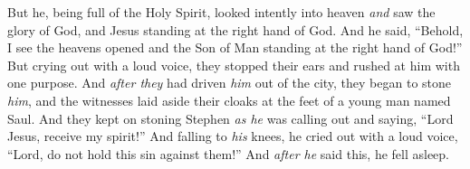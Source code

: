 \begin{biblechapter}
\verse But he, being full of the Holy Spirit, looked intently into heaven \textit{and} saw the glory of God, and Jesus standing at the right hand of God.
\verse And he said, “Behold, I see the heavens opened and the Son of Man standing at the right hand of God!”
\verse But crying out with a loud voice, they stopped their ears and rushed at him with one purpose.
\verse And \textit{after they} had driven \textit{him} out of the city, they began to stone \textit{him}, and the witnesses laid aside their cloaks at the feet of a young man named Saul.
\verse And they kept on stoning Stephen \textit{as he} was calling out and saying, “Lord Jesus, receive my spirit!”
\verse And falling to \textit{his} knees, he cried out with a loud voice, “Lord, do not hold this sin against them!” And \textit{after he} said this, he fell asleep.
\end{biblechapter}


